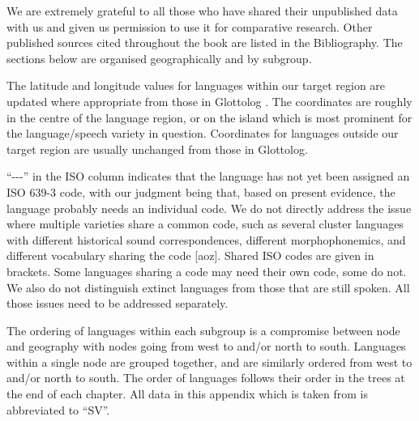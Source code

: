 We are extremely grateful to all those who have shared their
unpublished data with us
and given us permission to use it for comparative research.
Other published sources cited throughout the book are listed in the Bibliography.
The sections below are organised geographically and by subgroup.

The latitude and longitude values for languages within our target
region are updated where appropriate from those in Glottolog
\citep{Hammarstrom2023}.
The coordinates are roughly in the centre of the language region,
or on the island which is most prominent for the language/speech variety in question.
Coordinates for languages outside our target region are usually
unchanged from those in Glottolog.

“{-}{-}{-}” in the ISO column indicates that the language has
not yet been assigned an ISO 639-3 code,
with our judgment being that,
based on present evidence,
the language probably needs an individual code.
We do not directly address the issue where multiple varieties
share a common code,
such as several  cluster languages with different historical
sound correspondences, different morphophonemics,
and different vocabulary sharing the code [aoz].
Shared ISO codes are given in brackets.
Some languages sharing a code may need their own code, some do not.
We also do not distinguish extinct languages from those that are still spoken.
All those issues need to be addressed separately.

The ordering of languages within each subgroup is a compromise
between node and geography with nodes going from west to  and/or north to south.
Languages within a single node are grouped together,
and are similarly ordered from west to  and/or north to south.
The order of languages follows their order in the trees at the
end of each chapter.
All data in this appendix which is taken from 
\citet{SmitsVoorhoeve1992a,SmitsVoorhoeve1992b,
SmitsVoorhoeve1994,SmitsVoorhoeve1998} is abbreviated to “SV”.












	
	
	
	
	
	


	
	
	